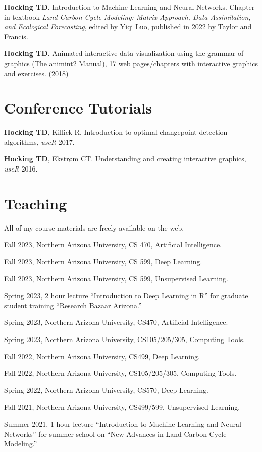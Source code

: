 \documentclass[margin,line]{res}
\begin{document}
\begin{resume}
{\bf Hocking TD}. Introduction to Machine Learning and Neural
Networks. Chapter in textbook {\it Land Carbon Cycle Modeling: Matrix
  Approach, Data Assimilation, and Ecological Forecasting}, edited by
Yiqi Luo, published in 2022 by Taylor and Francis.

{\bf Hocking TD}. Animated interactive data visualization using the
grammar of graphics (The animint2 Manual), 17 web pages/chapters with
interactive graphics and exercises. (2018)

\section{\sc Conference Tutorials}

{\bf Hocking TD}, Killick R. Introduction to optimal changepoint
detection algorithms, {\it useR} 2017.

{\bf Hocking TD}, Ekstr\o m CT. Understanding and creating interactive
graphics, {\it useR} 2016.

\section{\sc Teaching}

All of my course materials are freely available on the web.

Fall 2023, Northern Arizona University, CS 470, Artificial Intelligence.

Fall 2023, Northern Arizona University, CS 599, Deep Learning.

Fall 2023, Northern Arizona University, CS 599, Unsupervised Learning.

Spring 2023, 2 hour lecture ``Introduction to Deep Learning in R'' for
graduate student training ``Research Bazaar Arizona.''

Spring 2023, Northern Arizona University, CS470, Artificial Intelligence.

Spring 2023, Northern Arizona University, CS105/205/305, Computing Tools.

Fall 2022, Northern Arizona University, CS499, Deep Learning.

Fall 2022, Northern Arizona University, CS105/205/305, Computing Tools.

Spring 2022, Northern Arizona University, CS570, Deep Learning.

Fall 2021, Northern Arizona University, CS499/599, Unsupervised Learning.

Summer 2021, 1 hour lecture ``Introduction to Machine Learning and
Neural Networks'' for summer school on ``New Advances in Land Carbon
Cycle Modeling.''


\end{resume}
\end{document}

